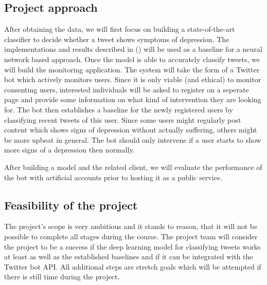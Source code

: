 \documentclass[colorback,accentcolor=tud9c]{tudreport}
\begin{document}
\subsection*{Project approach}

After obtaining the data, we will first focus on building a state-of-the-art classifier to decide whether a tweet shows symptoms of depression. The implementations and results described in (\cite{nadeem_identifying_2016,coppersmith2015clpsych,jamil_monitoring_2017}) will be used as a baseline for a neural network based approach. Once the model is able to accurately classify tweets, we will build the monitoring application. The system will take the form of a Twitter bot which actively monitors users. Since it is only viable (and ethical) to monitor consenting users, interested individuals will be asked to register on a seperate page and provide some information on what kind of intervention they are looking for. The bot then establishes a baseline for the newly registered users by classifying recent tweets of this user. Since some users might regularly post content which shows signs of depression without actually suffering, others might be more upbeat in general. The bot should only intervene if a user starts to show more signs of a depression then normally.

After building a model and the related client, we will evaluate the performance of the bot with artificial accounts prior to hosting it as a public service.

\subsection*{Feasibility of the project}
The project's scope is very ambitious and it stands to reason, that it will not be possible to complete all stages during the course. The project team will consider the project to be a success if the deep learning model for classifying tweets works at least as well as the established baselines and if it can be integrated with the Twitter bot API. All additional steps are stretch goals which will be attempted if there is still time during the project.

\printbibliography[heading=secbib]
\end{document}

